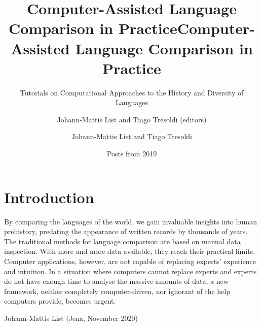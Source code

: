 \documentclass[
  a4paper,
  14pt,
  oneside,
  tablecaptionabove
]{scrbook}
\title{Computer-Assisted Language Comparison in Practice}
\subtitle{Tutorials on Computational Approaches to the History and Diversity of
Languages}
\date{Posts from 2019}
\author{Johann-Mattis List and Tiago Tresoldi (editors)}
\title{Computer-Assisted Language Comparison in Practice}
\author{Johann-Mattis List and Tiago Tresoldi}
\begin{document}

\begin{titlepage}
\afterpage{\restorepagecolor}
\newcommand{\colorRule}[3][black]{\textcolor[HTML]{#1}{\rule{#2}{#3}}}
\end{titlepage}
\restoregeometry




{
\setcounter{tocdepth}{3}
\tableofcontents
\newpage
}
\section*{Introduction}
By comparing the languages of the world, we gain invaluable insights
into human prehistory, predating the appearance of written records by
thousands of years. The traditional methods for language comparison are
based on manual data inspection. With more and more data available, they
reach their practical limits. Computer applications, however, are not
capable of replacing experts' experience and intuition. In a situation
where computers cannot replace experts and experts do not have enough
time to analyse the massive amounts of data, a new framework, neither
completely computer-driven, nor ignorant of the help computers provide,
becomes urgent.

\begin{flushright}
\noindent Johann-Mattis List (Jena, November 2020)
\end{flushright}
\end{document}
